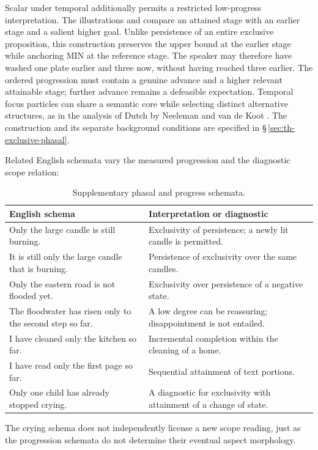Scalar  under temporal  additionally permits a
restricted low-progress interpretation. The illustrations
 and
 compare an
attained stage with an earlier stage and a salient higher goal. Unlike
persistence of an entire exclusive proposition, this construction preserves
the upper bound at the earlier stage while anchoring MIN at the reference
stage. The speaker may therefore have washed one plate earlier and three now,
without having reached three earlier. The ordered progression must contain
a genuine advance and a higher relevant attainable stage; further advance
remains a defeasible expectation. Temporal focus particles can share a
semantic core while selecting distinct
alternative structures, as in the analysis of Dutch by Neeleman and van de Koot
\cite[§§2--3]{neelemanvandekoot2022}. The construction and its separate
background conditions are specified in §\,\ref{sec:th-exclusive-phasal}.

Related English schemata vary the measured progression and the diagnostic
scope relation:
\begin{table}[ht]
\footnotesize
\caption{Supplementary phasal and progress schemata.}
\label{tab:kamo-phasal-schemata}
\begin{tabularx}{\textwidth}{L L}
\toprule
English schema & Interpretation or diagnostic \\
\midrule
Only the large candle is still burning. & Exclusivity of persistence; a newly lit candle is permitted. \\
It is still only the large candle that is burning. & Persistence of exclusivity over the same candles. \\
Only the eastern road is not flooded yet. & Exclusivity over persistence of a negative state. \\
The floodwater has risen only to the second step so far. & A low degree can be reassuring; disappointment is not entailed. \\
I have cleaned only the kitchen so far. & Incremental completion within the cleaning of a home. \\
I have read only the first page so far. & Sequential attainment of text portions. \\
Only one child has already stopped crying. & A diagnostic for exclusivity with attainment of a change of state. \\
\bottomrule
\end{tabularx}
\end{table}
The crying schema does not independently license a new scope reading, just as
the progression schemata do not determine their eventual aspect morphology.

